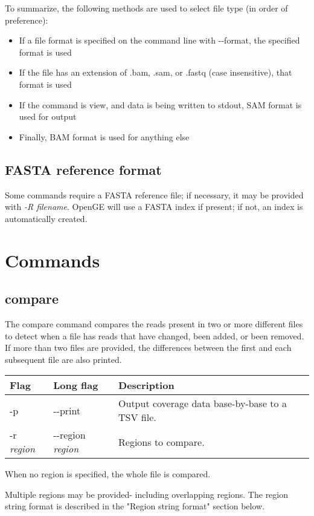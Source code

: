 \documentclass[11pt]{article}
\begin{document}
To summarize, the following methods are used to select file type (in order of preference):
\begin{itemize}
\item If a file format is specified on the command line with {-}{-}format, the specified format is used
\item If the file has an extension of .bam, .sam, or .fastq (case insensitive), that format is used
\item If the command is view, and data is being written to stdout, SAM format is used for output
\item Finally, BAM format is used for anything else
\end{itemize}

\subsection{FASTA reference format}
Some commands require a FASTA reference file; if necessary, it may be provided with \textit{-R filename}. OpenGE will use a FASTA index if present; if not, an index is automatically created.

\section {Commands}

\subsection {compare}
The compare command compares the reads present in two or more different files to detect when a file has reads that have changed, been added, or been removed. If more than two files are provided, the differences between the first and each subsequent file are also printed.

\begin{center}
\begin{tabular}{llp{3.5in}}
\hline
Flag&Long flag&Description\\ \hline
-p&{-}{-}print&Output coverage data base-by-base to a TSV file.\\
-r  \textit{region}&{-}{-}region \textit{region}&Regions to compare.\\
\end{tabular}
\end{center}

When no region is specified, the whole file is compared.

Multiple regions may be provided- including overlapping regions. The region string format is described in the "Region string format" section below.
\end{document}
